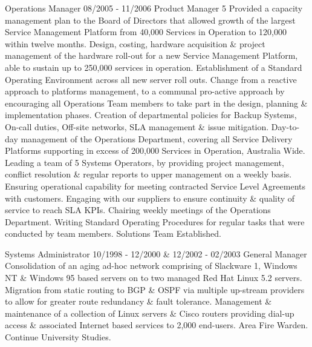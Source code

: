  Operations Manager
\lskip
{} 08/2005 - 11/2006
 Product Manager
 5
 Provided a capacity management plan to the Board of Directors that allowed growth of the largest Service Management Platform from 40,000 Services in Operation to 120,000 within twelve months.
\dashtopic Design, costing, hardware acquisition \& project management of the hardware roll-out for a new Service Management Platform, able to sustain up to 250,000 services in operation.
\dashtopic Establishment of a Standard Operating Environment across all new server roll outs.
\dashtopic Change from a reactive approach to platforms management, to a communal pro-active approach by encouraging all Operations Team members to take part in the design, planning \& implementation phases.
\dashtopic Creation of departmental policies for Backup Systems, On-call duties, Off-site networks, SLA management \& issue mitigation.
 Day-to-day management of the Operations Department, covering all Service Delivery Platforms supporting in excess of 200,000 Services in Operation, Australia Wide.
\dashtopic Leading a team of 5 Systems Operators, by providing project management, conflict resolution \& regular reports to upper management on a weekly basis.
\dashtopic Ensuring operational capability for meeting contracted Service Level Agreements with customers.
\dashtopic Engaging with our suppliers to ensure continuity \& quality of service to reach SLA KPIs.
\dashtopic Chairing weekly meetings of the Operations Department.
\dashtopic Writing Standard Operating Procedures for regular tasks that were conducted by team members.
 Solutions Team Established.
\pskip

 Systems Administrator
\lskip
{} 10/1998 - 12/2000 \& 12/2002 - 02/2003
 General Manager
 Consolidation of an aging ad-hoc network comprising of Slackware 1, Windows NT \& Windows 95 based servers on to two managed Red Hat Linux 5.2 servers.
\dashtopic Migration from static routing to BGP \& OSPF via multiple up-stream providers to allow for greater route redundancy \& fault tolerance.
 Management \& maintenance of a collection of Linux servers \& Cisco routers providing dial-up access \& associated Internet based services to 2,000 end-users.
\dashtopic Area Fire Warden.
 Continue University Studies.
\pskip

\section{\UOW}

